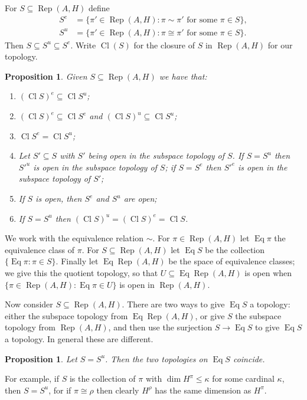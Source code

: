 \documentclass[a4paper,11pt]{article}
\newcommand{\Rep}{\operatorname{Rep}}
\newcommand{\Cl}{\operatorname{Cl}}
\newcommand{\Eq}{\operatorname{Eq}}
\newtheorem{proposition}[lemma]{Proposition}
\begin{document}
For $S \subseteq \Rep(A,H)$ define
\begin{align*}
S^e &= \{ \pi'\in\Rep(A,H) : \pi\sim\pi' \text{ for some } \pi\in S \}, \\
S^u &= \{ \pi'\in\Rep(A,H) : \pi\cong\pi' \text{ for some } \pi\in S \}.
\end{align*}
Then $S \subseteq S^u \subseteq S^e$.  Write $\Cl(S)$ for the closure of
$S$ in $\Rep(A,H)$ for our topology.

\begin{proposition}
Given $S\subseteq\Rep(A,H)$ we have that:
\begin{enumerate}
\item $(\Cl S)^e \subseteq \Cl S^u$;
\item $(\Cl S)^e \subseteq \Cl S^e$ and $(\Cl S)^u \subseteq \Cl S^u$;
\item $\Cl S^e = \Cl S^u$;
\item Let $S' \subseteq S$ with $S'$ being open in the subspace topology
of $S$.  If $S=S^u$ then ${S'}^u$ is open in the subspace topology of $S$;
if $S=S^e$ then ${S'}^e$ is open in the subspace topology of $S'$;
\item If $S$ is open, then $S^e$ and $S^u$ are open;
\item If $S = S^u$ then $(\Cl S)^u = (\Cl S)^e = \Cl S$.
\end{enumerate}
\end{proposition}

We work with the equivalence relation $\sim$.  For $\pi\in\Rep(A,H)$ let
$\Eq\pi$ the equivalence class of $\pi$.  For $S\subseteq\Rep(A,H)$ let
$\Eq S$ be the collection $\{\Eq\pi : \pi \in S\}$.  Finally let $\Eq\Rep(A,H)$
be the space of equivalence classes; we give this the quotient topology, so
that $U\subseteq \Eq\Rep(A,H)$ is open when $\{\pi\in\Rep(A,H):\Eq\pi\in U\}$
is open in $\Rep(A,H)$.

Now consider $S\subseteq \Rep(A,H)$.  There are two ways to give $\Eq S$ a
topology: either the subspace topology from $\Eq\Rep(A,H)$, or give $S$ the
subspace topology from $\Rep(A,H)$, and then use the surjection $S\rightarrow
\Eq S$ to give $\Eq S$ a topology.  In general these are different.

\begin{proposition}\label{prop:uni_equiv_im_unique}
Let $S=S^u$.  Then the two topologies on $\Eq S$ coincide.
\end{proposition}

For example, if $S$ is the collection of $\pi$ with $\dim H^\pi \leq \kappa$
for some cardinal $\kappa$, then $S=S^u$, for if $\pi\cong\rho$ then clearly
$H^\rho$ has the same dimension as $H^\pi$.
\end{document}
